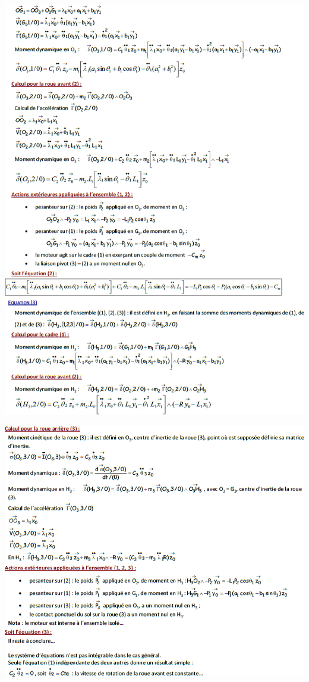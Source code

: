 \documentclass[10pt,fleqn]{article} %
\begin{document}
\begin{center}
\includegraphics[width=\linewidth]{images/cor_03}
\end{center}

\begin{center}
\includegraphics[width=\linewidth]{images/cor_04}
\end{center}

\end{document}
